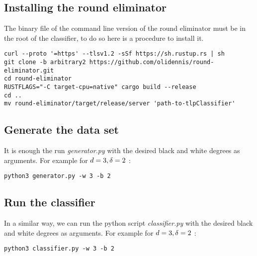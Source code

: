 \subsection{Installing the round eliminator}
The binary file of the command line version of the round eliminator must be in the root of the classifier, to do so here is a procedure to install it.
\begin{lstlisting}
curl --proto '=https' --tlsv1.2 -sSf https://sh.rustup.rs | sh
git clone -b arbitrary2 https://github.com/olidennis/round-eliminator.git
cd round-eliminator
RUSTFLAGS="-C target-cpu=native" cargo build --release
cd ..
mv round-eliminator/target/release/server 'path-to-tlpClassifier'
\end{lstlisting}
\subsection{Generate the data set}
It is enough the run \textit{generator.py} with the desired black and white degrees as arguments. For example for $d = 3, \delta =2$ :
\begin{lstlisting}
python3 generator.py -w 3 -b 2 
\end{lstlisting}
\subsection{Run the classifier}
In a similar way, we can run the python script \textit{classifier.py} with the desired black and white degrees as arguments. For example for $d = 3, \delta =2$ :
\begin{lstlisting}
python3 classifier.py -w 3 -b 2 
\end{lstlisting}
